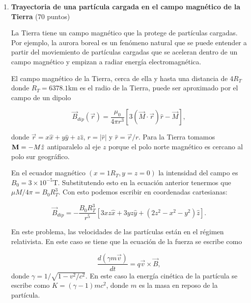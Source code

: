 \documentclass{article}
\begin{document}
\begin{enumerate}
\item {\bf Trayectoria de una part\'icula cargada en el campo
  magn\'etico de la Tierra} (70 puntos)  

La Tierra tiene un campo magn\'etico que la protege de part\'iculas
cargadas. Por ejemplo, la aurora boreal es un fen\'omeno natural que se puede
entender a partir del moviemiento de part\'iculas cargadas que se
aceleran dentro de un campo magn\'etico y empizan a radiar energ\'ia
electromagn\'etica.  

El campo magn\'etico de la Tierra, cerca de ella y hasta una distancia
de 4$R_{T}$ donde $R_T=6378.1$km es el radio de  la Tierra, puede ser
aproximado por el campo de un dipolo 

\begin{equation}
\vec{B}_{dip}(\vec{r}) = \frac{\mu_0}{4\pi r^3}[3(\vec{M}\cdot\vec{
    r})\hat{r}-\vec{M}], 
\end{equation}

donde $\vec{r}=x\hat{x} + y\hat{y} + z\hat{z}$, $r=|\hat{r}|$ y
$\hat{r}=\vec{r}/r$. Para la Tierra tomamos ${\bf M}=-M\hat{z}$
  antiparalelo al eje $z$ porque el polo norte magn\'etico es cercano
  al polo sur geogr\'afico. 

En el ecuador magn\'etico $(x=1R_T,y=z=0)$ la intensidad del campo es
$B_0=3\times 10^{-5}$T. Substitutendo esto en la ecuaci\'on anterior
tenermos que $\mu M/4\pi=B_0R_T^3$. Con esto podemos escribir en
coordenadas cartesianas:

\begin{equation}
\vec{B}_{dip} = -\frac{B_0 R_T^3}{r^5}[3xz\hat{x} + 3yz\hat{y} + (2z^2
  - x^2 -y^2)\hat{z}].
\end{equation}

En este problema, las velocidades de las part\'iculas est\'an en el r\'egimen relativista. En este caso se tiene que la ecuaci\'on de la fuerza se escribe como

\begin{equation}
\frac{d(\gamma m \vec{v})}{dt} = q\vec{v}\times\vec{B}, 
\end{equation}
%
donde $\gamma=1/\sqrt{1-v^2/c^2}$. En este caso la energ\'ia cin\'etica de la part\'icula se escribe como $K=(\gamma -1)mc^2$, donde $m$ es la masa en reposo de la part\'icula. 

\begin{itemize}


\end{itemize}
\end{enumerate}
\end{document}
